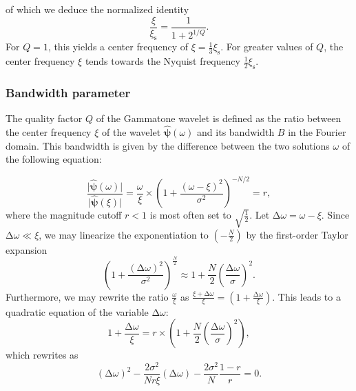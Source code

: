 \documentclass[smallextended]{svjour3}
\begin{document}
of which we deduce the normalized identity
\[
\dfrac{\xi}{\xi_\mathrm{s}}=\dfrac{1}{1+2^{1/Q}}.
\]
For $Q=1$, this yields a center frequency of $\xi=\frac{1}{3}\xi_{\mathrm{s}}$.
For greater values of $Q$, the center frequency $\xi$ tends towards the Nyquist frequency $\frac{1}{2}\xi_{\mathrm{s}}$.


\subsubsection*{Bandwidth parameter}

The quality factor $Q$ of the Gammatone wavelet is defined as the
ratio between the center frequency $\xi$ of the wavelet $\boldsymbol{\hat{\psi}}(\omega)$
and its bandwidth $B$ in the Fourier domain. This bandwidth is given
by the difference between the two solutions $\omega$ of the following
equation:

\[
\dfrac{\vert\boldsymbol{\hat{\psi}}(\omega)\vert}{\vert\boldsymbol{\hat{\psi}}(\xi)\vert}
=
\dfrac{\omega}{\xi}\times
\left(1+\dfrac{\left(\omega-\xi\right)^{2}}{\sigma^{2}}\right)^{-N/2}=r,
\]
where the magnitude cutoff $r<1$ is most
often set to $\sqrt{\frac{1}{2}}$. Let $\mathrm{\Delta}\omega=\omega-\xi$.
Since $\mathrm{\Delta}\omega\ll\xi$, we may linearize the exponentiation to $(-\tfrac{N}{2})$ by the first-order Taylor expansion
\[
\left(1 + \frac{(\mathrm{\Delta}\omega)^2}{\sigma^2}\right)^{\frac{N}{2}} 
\approx
1 + \frac{N}{2} \left(\frac{\mathrm{\Delta}\omega}{\sigma}\right)^2.
\]
Furthermore, we may rewrite the ratio $\frac{\omega}{\xi}$ as $\frac{\xi + \mathrm{\Delta}\omega}{\xi} = (1 + \frac{\mathrm{\Delta}{\omega}}{\xi})$.
This leads to a quadratic equation
of the variable $\mathrm{\Delta}\omega$:
\[
1 + \dfrac{\mathrm{\Delta}\omega}{\xi}
=
r
\times
\left(1 + \dfrac{N}{2} \left(\dfrac{\mathrm{\Delta}\omega}{\sigma}\right)^2 \right),
\]
which rewrites as
\[
(\mathrm{\Delta}\omega)^2
- \dfrac{2\sigma^2}{Nr\xi} (\mathrm{\Delta}\omega)
- \dfrac{2\sigma^2}{N} \dfrac{1-r}{r} = 0.
\]
\end{document}
